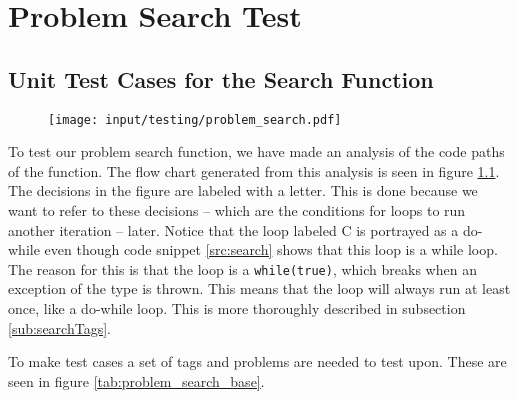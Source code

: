 \chapter{Problem Search Test}
\label{chap:problem_search_test}

\section{Unit Test Cases for the Search Function}
\label{sec:unit_problem_search}
\begin{figure}[h]
	\centering
		\texttt{[image: input/testing/problem\_search.pdf]}
	\label{fig:problem_search_flow}
\end{figure}

To test our problem search function, we have made an analysis of the code paths of the function.
The flow chart generated from this analysis is seen in figure \ref{fig:problem_search_flow}.
The decisions in the figure are labeled with a letter.
This is done because we want to refer to these decisions -- which are the conditions for loops to run another iteration -- later.
Notice that the loop labeled C is portrayed as a do-while even though code snippet \ref{src:search} shows that this loop is a while loop.
The reason for this is that the loop is a \verb|while(true)|, which breaks when an exception of the type  is thrown.
This means that the loop will always run at least once, like a do-while loop.
This is more thoroughly described in subsection \ref{sub:searchTags}.

To make test cases a set of tags and problems are needed to test upon.
These are seen in figure \ref{tab:problem_search_base}.


